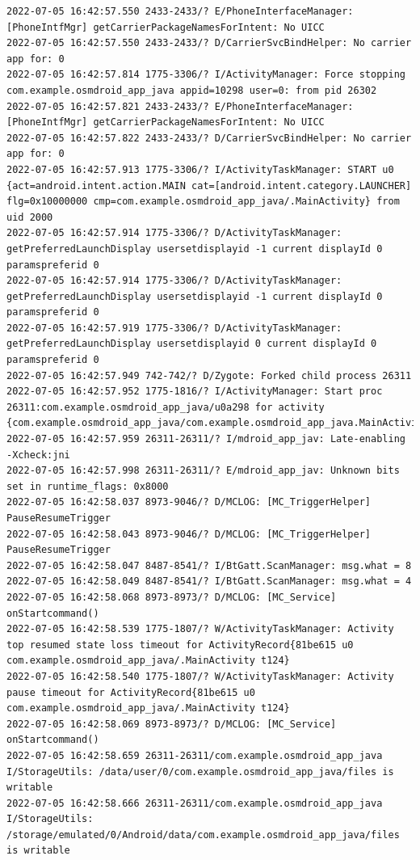 \documentclass[a4paper,12pt]{book}
\begin{document}
\begin{lstlisting}
2022-07-05 16:42:57.550 2433-2433/? E/PhoneInterfaceManager: [PhoneIntfMgr] getCarrierPackageNamesForIntent: No UICC
2022-07-05 16:42:57.550 2433-2433/? D/CarrierSvcBindHelper: No carrier app for: 0
2022-07-05 16:42:57.814 1775-3306/? I/ActivityManager: Force stopping com.example.osmdroid_app_java appid=10298 user=0: from pid 26302
2022-07-05 16:42:57.821 2433-2433/? E/PhoneInterfaceManager: [PhoneIntfMgr] getCarrierPackageNamesForIntent: No UICC
2022-07-05 16:42:57.822 2433-2433/? D/CarrierSvcBindHelper: No carrier app for: 0
2022-07-05 16:42:57.913 1775-3306/? I/ActivityTaskManager: START u0 {act=android.intent.action.MAIN cat=[android.intent.category.LAUNCHER] flg=0x10000000 cmp=com.example.osmdroid_app_java/.MainActivity} from uid 2000
2022-07-05 16:42:57.914 1775-3306/? D/ActivityTaskManager: getPreferredLaunchDisplay usersetdisplayid -1 current displayId 0 paramspreferid 0
2022-07-05 16:42:57.914 1775-3306/? D/ActivityTaskManager: getPreferredLaunchDisplay usersetdisplayid -1 current displayId 0 paramspreferid 0
2022-07-05 16:42:57.919 1775-3306/? D/ActivityTaskManager: getPreferredLaunchDisplay usersetdisplayid 0 current displayId 0 paramspreferid 0
2022-07-05 16:42:57.949 742-742/? D/Zygote: Forked child process 26311
2022-07-05 16:42:57.952 1775-1816/? I/ActivityManager: Start proc 26311:com.example.osmdroid_app_java/u0a298 for activity {com.example.osmdroid_app_java/com.example.osmdroid_app_java.MainActivity}
2022-07-05 16:42:57.959 26311-26311/? I/mdroid_app_jav: Late-enabling -Xcheck:jni
2022-07-05 16:42:57.998 26311-26311/? E/mdroid_app_jav: Unknown bits set in runtime_flags: 0x8000
2022-07-05 16:42:58.037 8973-9046/? D/MCLOG: [MC_TriggerHelper] PauseResumeTrigger
2022-07-05 16:42:58.043 8973-9046/? D/MCLOG: [MC_TriggerHelper] PauseResumeTrigger
2022-07-05 16:42:58.047 8487-8541/? I/BtGatt.ScanManager: msg.what = 8
2022-07-05 16:42:58.049 8487-8541/? I/BtGatt.ScanManager: msg.what = 4
2022-07-05 16:42:58.068 8973-8973/? D/MCLOG: [MC_Service] onStartcommand()
2022-07-05 16:42:58.539 1775-1807/? W/ActivityTaskManager: Activity top resumed state loss timeout for ActivityRecord{81be615 u0 com.example.osmdroid_app_java/.MainActivity t124}
2022-07-05 16:42:58.540 1775-1807/? W/ActivityTaskManager: Activity pause timeout for ActivityRecord{81be615 u0 com.example.osmdroid_app_java/.MainActivity t124}
2022-07-05 16:42:58.069 8973-8973/? D/MCLOG: [MC_Service] onStartcommand()
2022-07-05 16:42:58.659 26311-26311/com.example.osmdroid_app_java I/StorageUtils: /data/user/0/com.example.osmdroid_app_java/files is writable
2022-07-05 16:42:58.666 26311-26311/com.example.osmdroid_app_java I/StorageUtils: /storage/emulated/0/Android/data/com.example.osmdroid_app_java/files is writable

\end{lstlisting}
\end{document}
